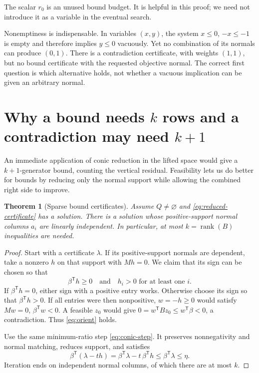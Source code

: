 \documentclass[11pt,letterpaper]{article}
\newcommand{\T}{\mathsf T}
\DeclareMathOperator{\rank}{rank}
\newtheorem{theorem}{Theorem}[section]
\theoremstyle{definition}
\theoremstyle{remark}
\numberwithin{equation}{section}
\begin{document}
The scalar \(r_0\) is an unused bound budget. It is helpful in this proof;
we need not introduce it as a variable in the eventual search.

Nonemptiness is indispensable. In variables \((x,y)\), the system
\(x\le0\), \(-x\le-1\) is empty and therefore implies \(y\le0\) vacuously.
Yet no combination of its normals can produce \((0,1)\).
There is a contradiction certificate, with weights \((1,1)\), but no bound
certificate with the requested objective normal. The correct first question
is which alternative holds, not whether a vacuous implication can be given
an arbitrary normal.

\section{Why a bound needs \texorpdfstring{\(k\)}{k} rows and a contradiction may need \texorpdfstring{\(k+1\)}{k+1}}
\label{sec:sparsity}

An immediate application of conic reduction in the lifted space would give
a \(k+1\)-generator bound, counting the vertical residual. Feasibility lets
us do better for bounds by reducing only the normal support while allowing
the combined right side to improve.

\begin{theorem}[Sparse bound certificates]\label{thm:sparse-bound}
Assume \(Q\ne\varnothing\) and \eqref{eq:reduced-certificate} has a solution.
There is a solution whose positive-support normal columns \(a_i\) are
linearly independent. In particular, at most \(k=\rank(B)\) inequalities
are needed.
\end{theorem}
\begin{proof}
Start with a certificate \(\lambda\). If its positive-support normals are
dependent, take a nonzero \(h\) on that support with \(Mh=0\).
We claim that its sign can be chosen so that
\begin{equation}\label{eq:orient}
 \beta^\T h\ge0\quad\text{and}\quad h_i>0
 \text{ for at least one }i.
\end{equation}
If \(\beta^\T h=0\), either sign with a positive entry works.
Otherwise choose its sign so that \(\beta^\T h>0\).
If all entries were then nonpositive, \(w=-h\ge0\) would satisfy
\(Mw=0\), \(\beta^\T w<0\). A feasible \(z_0\) would give
\(0=w^\T Bz_0\le w^\T\beta<0\), a contradiction.
Thus \eqref{eq:orient} holds.

Use the same minimum-ratio step \eqref{eq:conic-step}. It preserves
nonnegativity and normal matching, reduces support, and satisfies
\[
 \beta^\T(\lambda-t h)=\beta^\T\lambda-t\,\beta^\T h
       \le\beta^\T\lambda\le\eta.
\]
Iteration ends on independent normal columns, of which there are at most \(k\).
\end{proof}
\end{document}
